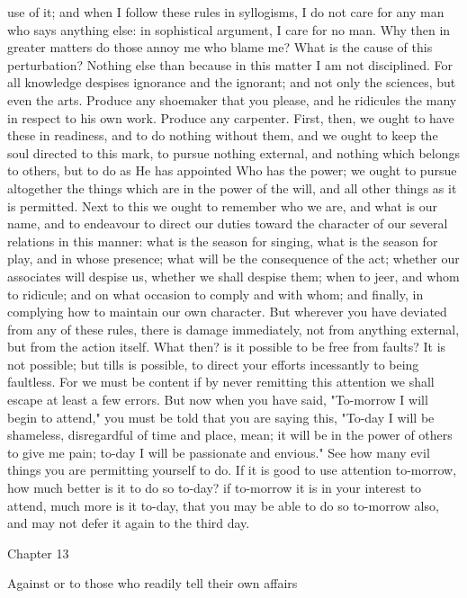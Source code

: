 \documentclass[a4paper]{article}
\begin{document}
use of it; and when I follow these rules in syllogisms, I do not care for any
man who says anything else: in sophistical argument, I care for no man. Why
then in greater matters do those annoy me who blame me? What is the cause of
this perturbation? Nothing else than because in this matter I am not
disciplined. For all knowledge despises ignorance and the ignorant; and not
only the sciences, but even the arts. Produce any shoemaker that you please,
and he ridicules the many in respect to his own work. Produce any carpenter.
    First, then, we ought to have these in readiness, and to do nothing without
them, and we ought to keep the soul directed to this mark, to pursue nothing
external, and nothing which belongs to others, but to do as He has appointed
Who has the power; we ought to pursue altogether the things which are in the
power of the will, and all other things as it is permitted. Next to this we
ought to remember who we are, and what is our name, and to endeavour to direct
our duties toward the character of our several relations in this manner: what
is the season for singing, what is the season for play, and in whose presence;
what will be the consequence of the act; whether our associates will despise
us, whether we shall despise them; when to jeer, and whom to ridicule; and on
what occasion to comply and with whom; and finally, in complying how to
maintain our own character. But wherever you have deviated from any of these
rules, there is damage immediately, not from anything external, but from the
action itself.
    What then? is it possible to be free from faults? It is not possible; but
tills is possible, to direct your efforts incessantly to being faultless. For
we must be content if by never remitting this attention we shall escape at
least a few errors. But now when you have said, "To-morrow I will begin to
attend," you must be told that you are saying this, "To-day I will be
shameless, disregardful of time and place, mean; it will be in the power of
others to give me pain; to-day I will be passionate and envious." See how many
evil things you are permitting yourself to do. If it is good to use attention
to-morrow, how much better is it to do so to-day? if to-morrow it is in your
interest to attend, much more is it to-day, that you may be able to do so
to-morrow also, and may not defer it again to the third day.

Chapter 13

Against or to those who readily tell their own affairs
\end{document}
